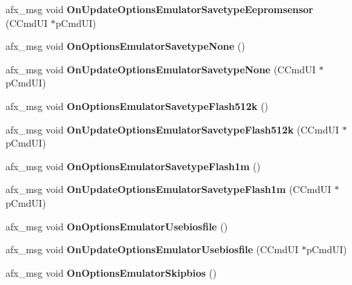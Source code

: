 \begin{DoxyCompactItemize}
\item 
\mbox{\label{class_main_wnd_afc4b0435b25dfd00d358f2ad05b5193a}} 
afx\+\_\+msg void {\bfseries On\+Update\+Options\+Emulator\+Savetype\+Eepromsensor} (C\+Cmd\+UI $\ast$p\+Cmd\+UI)
\item 
\mbox{\label{class_main_wnd_a41903300d898006e3d52466dd2ceb283}} 
afx\+\_\+msg void {\bfseries On\+Options\+Emulator\+Savetype\+None} ()
\item 
\mbox{\label{class_main_wnd_acd01898bd8817e39f36dbd01d940dfc9}} 
afx\+\_\+msg void {\bfseries On\+Update\+Options\+Emulator\+Savetype\+None} (C\+Cmd\+UI $\ast$p\+Cmd\+UI)
\item 
\mbox{\label{class_main_wnd_a10c98fcb234998c2d621585d4b244451}} 
afx\+\_\+msg void {\bfseries On\+Options\+Emulator\+Savetype\+Flash512k} ()
\item 
\mbox{\label{class_main_wnd_ae2bb26c3109ad3cb4cdd3a81b2584477}} 
afx\+\_\+msg void {\bfseries On\+Update\+Options\+Emulator\+Savetype\+Flash512k} (C\+Cmd\+UI $\ast$p\+Cmd\+UI)
\item 
\mbox{\label{class_main_wnd_ac70aeadfab0e7ed9120a03f11564f56c}} 
afx\+\_\+msg void {\bfseries On\+Options\+Emulator\+Savetype\+Flash1m} ()
\item 
\mbox{\label{class_main_wnd_a9626a5265957c4674aff99fec01356bf}} 
afx\+\_\+msg void {\bfseries On\+Update\+Options\+Emulator\+Savetype\+Flash1m} (C\+Cmd\+UI $\ast$p\+Cmd\+UI)
\item 
\mbox{\label{class_main_wnd_a26ef871056784bfd1f22efd86dc96991}} 
afx\+\_\+msg void {\bfseries On\+Options\+Emulator\+Usebiosfile} ()
\item 
\mbox{\label{class_main_wnd_a602a9a86e5cc8e903fbf201a4478a3bc}} 
afx\+\_\+msg void {\bfseries On\+Update\+Options\+Emulator\+Usebiosfile} (C\+Cmd\+UI $\ast$p\+Cmd\+UI)
\item 
\mbox{\label{class_main_wnd_a41f8561c0b900be55957b1b6be4b6930}} 
afx\+\_\+msg void {\bfseries On\+Options\+Emulator\+Skipbios} ()

\end{DoxyCompactItemize}
